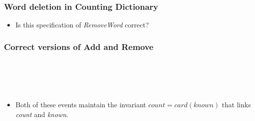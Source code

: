 \documentclass{beamer}
\begin{document}
\begin{frame}

\frametitle{Word deletion in Counting Dictionary}






\begin{itemize}
  \item {Is this specification of \textit{RemoveWord} correct?}
\end{itemize}


\end{frame}





\begin{frame}
\frametitle{Correct versions of Add and Remove}


\begin{columns}
\begin{column}{2in}
\end{column}
\begin{column}{2in}
\end{column}
\end{columns}

~

~

\begin{itemize}
  \item Both of these events maintain the invariant \alert{$count = card(known)$}
that \alert{links} \textit{count} and \textit{known}.
\end{itemize}

\end{frame}
\end{document}
